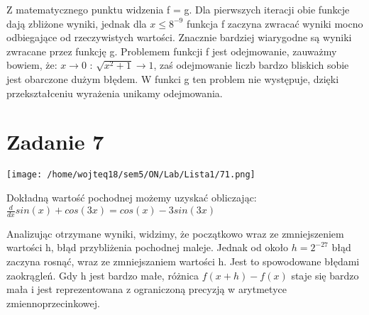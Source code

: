 \documentclass{article}
\begin{document}
Z matematycznego punktu widzenia f = g. Dla pierwszych iteracji obie funkcje dają zbliżone wyniki, jednak dla $ x \leq 8^{-9}$ funkcja f zaczyna zwracać
wyniki mocno odbiegające od rzeczywistych wartości. Znacznie bardziej wiarygodne są wyniki zwracane przez funkcję g. Problemem funkcji f jest odejmowanie, zauważmy bowiem, że:
$x \rightarrow 0$ : $\sqrt{x^{2} + 1} \rightarrow 1$, zaś odejmowanie liczb bardzo bliskich sobie jest obarczone dużym błędem. 
W funkci g ten problem nie występuje, dzięki przekształceniu wyrażenia unikamy odejmowania.

\section*{Zadanie 7}
\texttt{[image: /home/wojteq18/sem5/ON/Lab/Lista1/71.png]}

Dokładną wartość pochodnej możemy uzyskać obliczając: $\frac{d}{dx} sin(x) + cos (3x) = cos(x) - 3sin(3x)$

Analizując otrzymane wyniki, widzimy, że początkowo wraz ze zmniejszeniem wartości h, błąd przybliżenia pochodnej maleje. Jednak od około $ h = 2^{-27}$ błąd zaczyna 
rosnąć, wraz ze zmniejszaniem wartości h. Jest to spowodowane błędami zaokrągleń. Gdy h jest bardzo małe, różnica $f(x+h) - f(x)$ staje się bardzo mała i jest
reprezentowana z ograniczoną precyzją w arytmetyce zmiennoprzecinkowej. 
\end{document}
